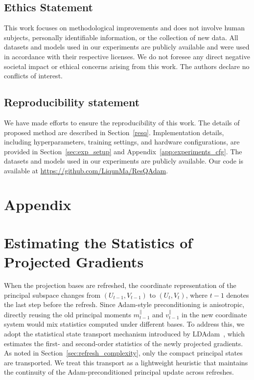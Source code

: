 \documentclass{article} %
\begin{document}
\subsection*{Ethics Statement}
This work focuses on methodological improvements and does not involve human subjects, personally identifiable information, or the collection of new data. All datasets and models used in our experiments are publicly available and were used in accordance with their respective licenses. We do not foresee any direct negative societal impact or ethical concerns arising from this work. The authors declare no conflicts of interest.

\subsection*{Reproducibility statement}
We have made efforts to ensure the reproducibility of this work. The details of proposed method are described in Section~\ref{resq}. Implementation details, including hyperparameters, training settings, and hardware configurations, are provided in Section~\ref{sec:exp_setup} and Appendix~\ref{app:experiments_cfg}. The datasets and models used in our experiments are publicly available. Our code is available at \url{https://github.com/LiqunMa/ResQAdam}.





\clearpage
\appendix

\section*{\Large{Appendix}}
\section{Estimating the Statistics of Projected Gradients}
\label{app:state_transport}

When the projection bases are refreshed, the coordinate representation of the
principal subspace changes from $(U_{t-1},V_{t-1})$ to $(U_t,V_t)$, where $t-1$
denotes the last step before the refresh. Since Adam-style preconditioning is
anisotropic, directly reusing the old principal moments $m_{t-1}^{\parallel}$ and
$v_{t-1}^{\parallel}$ in the new coordinate system would mix statistics computed
under different bases. To address this, we adopt the statistical state transport mechanism introduced by LDAdam~\citep{robert2025ldadam}, which estimates the first- and second-order statistics of the newly projected gradients. As noted in Section~\ref{sec:refresh_complexity}, only the compact principal states are transported. We treat this transport as a lightweight heuristic that maintains the continuity of the Adam-preconditioned principal update across refreshes.
\end{document}
